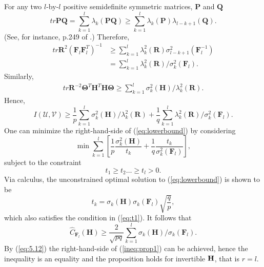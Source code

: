 \documentclass[12pt,onecolumn,draftcls]{IEEEtran}
\begin{document}
For any two $l$-by-$l$ positive semidefinite symmetric matrices, 
$\mathbf{P}$ and $\mathbf{Q}$
\begin{equation}
tr \mathbf{PQ} = \sum_{k=1}^l \lambda_k(\mathbf{PQ}) \geq \sum_{k=1}^l \lambda_k(\mathbf{P}) \lambda_{l-k+1}(\mathbf{Q}).
\end{equation}
(See, for instance, p.249 of \cite{mo}.)  Therefore,
\begin{align}
tr \mathbf{R}^2 (\mathbf{F}_l\mathbf{F}_l^T)^{-1} 
&\geq \sum_{k=1}^l \lambda_k^2(\mathbf{R}) \sigma_{l-k+1}^2(\mathbf{F}_l^{-1})\\
&= \sum_{k=1}^l \lambda_k^2(\mathbf{R})/\sigma_{k}^2(\mathbf{F}_l).
\end{align}
Similarly,
\begin{equation}
\begin{array}{lll}
tr \mathbf{R}^{-2} \mathbf{\Theta}^T \mathbf{H}^T \mathbf{H} \mathbf{\Theta}
\geq  \sum_{k=1}^l \sigma_k^2(\mathbf{H}) / \lambda_k^{2}(\mathbf{R}).
\end{array}
\end{equation}
Hence,
\begin{equation}
I(\mathcal{U},\mathcal{V})  \geq \dfrac{1}{p} \sum_{k=1}^l \sigma_k^2(\mathbf{H}) / \lambda_k^{2}(\mathbf{R}) +
\dfrac{1}{q}\sum_{k=1}^l \lambda_k^2(\mathbf{R})/\sigma_{k}^2(\mathbf{F}_l) .
\label{eq:lowerbound}
\end{equation}
One can minimize the right-hand-side of (\ref{eq:lowerbound}) by considering
\begin{equation}
\min \sum_{k=1}^l \left[ \dfrac{1}{p}\dfrac{\sigma_k^2(\mathbf{H})}{t_k} 
+ \dfrac{1}{q}\dfrac{t_k}{\sigma_{k}^2(\mathbf{F}_l) } \right],
\end{equation}
subject to the constraint
\begin{equation}
t_1 \geq t_2 \ldots \geq t_l > 0.
\label{eq:t1}
\end{equation}
Via calculus, the unconstrained optimal solution to (\ref{eq:lowerbound}) is shown to be
\begin{equation}
t_k=\sigma_k(\mathbf{H})\sigma_k(\mathbf{F}_l)\sqrt{\frac{q}{p}},
\end{equation}
which also satisfies the condition in (\ref{eq:t1}).  It follows that
\begin{equation}
\hat{C}_{\mathbf{F}_l}(\mathbf{H}) \geq \frac{2}{\sqrt{pq}}
\sum_{k=1}^l \sigma_k(\mathbf{H})/\sigma_{k}(\mathbf{F}_l).
\label{ineq:prop1}
\end{equation}
By (\ref{eq:5.12}) the right-hand-side of (\ref{ineq:prop1}) can be achieved, hence the inequality is an equality and the proposition holds for invertible $\bf H$, that is $r=l$.
\end{document}
